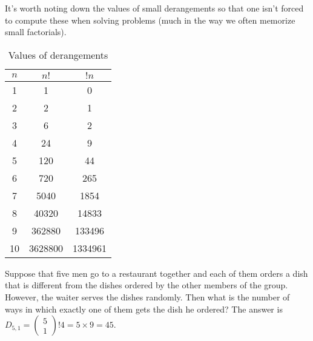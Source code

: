 It's worth noting down the values of small derangements so that one
isn't forced to compute these when solving problems (much in the way
we often memorize small factorials).

\begin{table}

\caption{Values of derangements}

\begin{centering}
\begin{tabular}{ccc}
\hline 
$n$ & $n!$ & $!n$\tabularnewline
\hline 
\hline 
1 & 1 & 0\tabularnewline
2 & 2 & 1\tabularnewline
3 & 6 & 2\tabularnewline
4 & 24 & 9\tabularnewline
5 & 120 & 44\tabularnewline
6 & 720 & 265\tabularnewline
7 & 5040 & 1854\tabularnewline
8 & 40320 & 14833\tabularnewline
9 & 362880 & 133496\tabularnewline
10 & 3628800 & 1334961\tabularnewline
\end{tabular}
\par\end{centering}
\end{table}

\begin{example}[JAM 2022 P-54]
\label{exa:jam2022p54}Suppose that five men go to a restaurant together
and each of them orders a dish that is different from the dishes ordered
by the other members of the group. However, the waiter serves the
dishes randomly. Then what is the number of ways in which exactly
one of them gets the dish he ordered? The answer is $D_{5,1}=\left(\begin{array}{c}
5\\
1
\end{array}\right)!4=5\times9=45$.
\end{example}

